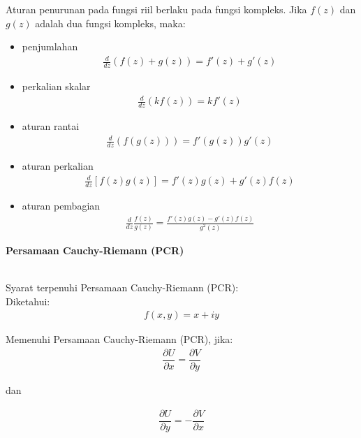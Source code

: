 \documentclass{article}
\begin{document}
\newpage
Aturan penurunan pada fungsi riil berlaku pada fungsi kompleks. Jika $f(z)$ dan $g(z)$ adalah dua fungsi kompleks, maka:
\begin{itemize}
    \item penjumlahan
          \begin{align}
              \boxed{\frac{d}{dz}(f(z)+g(z)) = f'(z) + g'(z)}
              \nonumber
          \end{align}
    \item perkalian skalar
          \begin{align}
              \boxed{\frac{d}{dz}(kf(z)) = kf'(z)}
              \nonumber
          \end{align}
    \item aturan rantai
          \begin{align}
              \boxed{\frac{d}{dz}(f(g(z))) = f'(g(z)) g'(z)}
              \nonumber
          \end{align}
    \item aturan perkalian
          \begin{align}
              \boxed{\frac{d}{dz}[f(z)g(z)] = f'(z)g(z) + g'(z)f(z)}
              \nonumber
          \end{align}
    \item aturan pembagian
          \begin{align}
              \boxed{\frac{d}{dz}\frac{f(z)}{g(z)} = \frac{f'(z)g(z) - g'(z)f(z)}{g^2(z)}}
              \nonumber
          \end{align}
\end{itemize}



\newpage
\begin{center}
    \textbf{Persamaan Cauchy-Riemann (PCR)}
\end{center}
\leavevmode\\

Syarat terpenuhi Persamaan Cauchy-Riemann (PCR):\\

Diketahui:
\begin{align}
    f(x,y) = x + iy
    \nonumber
\end{align}

Memenuhi Persamaan Cauchy-Riemann (PCR), jika:
\begin{align}
    \dfrac{\partial U}{\partial x} = \dfrac{\partial V}{\partial y}
    \nonumber
\end{align}
\begin{center}
    dan
\end{center}
\begin{align}
    \dfrac{\partial U}{\partial y} = -\dfrac{\partial V}{\partial x}
    \nonumber
\end{align}
\end{document}
